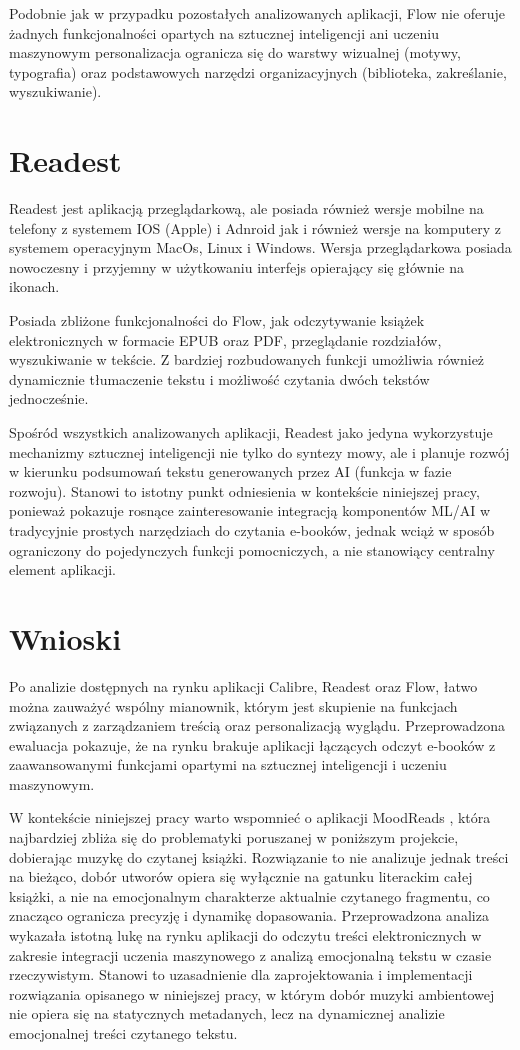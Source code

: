 Podobnie jak w przypadku pozostałych analizowanych aplikacji, Flow nie oferuje żadnych funkcjonalności opartych na sztucznej inteligencji ani uczeniu maszynowym personalizacja ogranicza się do warstwy wizualnej (motywy, typografia) oraz podstawowych narzędzi organizacyjnych (biblioteka, zakreślanie, wyszukiwanie).

\section{Readest}
Readest \cite{Readest} jest aplikacją przeglądarkową, ale posiada również wersje mobilne na telefony z systemem IOS (Apple) i Adnroid jak i również wersje na komputery z systemem operacyjnym MacOs, Linux i Windows. Wersja przeglądarkowa posiada nowoczesny i przyjemny w użytkowaniu interfejs opierający się głównie na ikonach.

Posiada zbliżone funkcjonalności do Flow, jak odczytywanie książek elektronicznych w formacie EPUB oraz PDF, przeglądanie rozdziałów, wyszukiwanie w tekście. Z bardziej rozbudowanych funkcji umożliwia również dynamicznie tłumaczenie tekstu i możliwość czytania dwóch tekstów jednocześnie.

Spośród wszystkich analizowanych aplikacji, Readest jako jedyna wykorzystuje mechanizmy sztucznej inteligencji nie tylko do syntezy mowy, ale i planuje rozwój w kierunku podsumowań tekstu generowanych przez AI (funkcja w fazie rozwoju). Stanowi to istotny punkt odniesienia w kontekście niniejszej pracy, ponieważ pokazuje rosnące zainteresowanie integracją komponentów ML/AI w tradycyjnie prostych narzędziach do czytania e-booków, jednak wciąż w sposób ograniczony do pojedynczych funkcji pomocniczych, a nie stanowiący centralny element aplikacji.

\section{Wnioski}
Po analizie dostępnych na rynku aplikacji Calibre, Readest oraz Flow, łatwo można zauważyć wspólny mianownik, którym jest skupienie na funkcjach związanych z zarządzaniem treścią oraz personalizacją wyglądu. Przeprowadzona ewaluacja pokazuje, że na rynku brakuje aplikacji łączących odczyt e-booków z zaawansowanymi funkcjami opartymi na sztucznej inteligencji i uczeniu maszynowym.

W kontekście niniejszej pracy warto wspomnieć o aplikacji MoodReads \cite{MoodeReads}, która najbardziej zbliża się do problematyki poruszanej w poniższym projekcie, dobierając muzykę do czytanej książki. Rozwiązanie to nie analizuje jednak treści na bieżąco, dobór utworów opiera się wyłącznie na gatunku literackim całej książki, a nie na emocjonalnym charakterze aktualnie czytanego fragmentu, co znacząco ogranicza precyzję i dynamikę dopasowania.
\newpage
Przeprowadzona analiza wykazała istotną lukę na rynku aplikacji do odczytu treści elektronicznych w zakresie integracji uczenia maszynowego z analizą emocjonalną tekstu w czasie rzeczywistym. Stanowi to uzasadnienie dla zaprojektowania i implementacji rozwiązania opisanego w niniejszej pracy, w którym dobór muzyki ambientowej nie opiera się na statycznych metadanych, lecz na dynamicznej analizie emocjonalnej treści czytanego tekstu.
